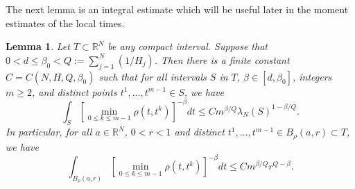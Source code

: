 \documentclass[11pt, reqno]{amsart}
\newtheorem{lemma}[theorem]{Lemma}
\def\R{{\mathbb R}}
\numberwithin{equation}{section}
\begin{document}
The next lemma is an integral estimate which will be useful later in the moment estimates of the local times.

\begin{lemma}\label{Lem:Bd_int}
Let $T \subset \R^N$ be any compact interval. Suppose that $0 < d \le \beta_0 < Q :=  \sum_{j=1}^N (1/H_j)$.
Then there is a finite constant $C = C(N, H, Q, \beta_0)$ such that for all intervals $S$ in $T$,  $\beta 
\in [d, \beta_0]$, integers $m \ge 2$, and distinct points $t^1, \dots, t^{m-1} \in S$, we have
\begin{equation}\label{Eq:Bd_int_Leb}
 \int_S \left[ \min_{0\le k \le m-1} \rho(t, t^k) \right]^{-\beta} dt \le C m^{\beta/Q} \lambda_N(S)^{1-\beta/Q}.
\end{equation}
In particular, for all $a \in \R^N$, $0 < r < 1$ and distinct $t^1, \dots, t^{m-1} \in B_\rho(a, r) \subset T$, we have
\begin{equation}\label{Eq:Bd_int}
 \int_{B_\rho(a, r)} \left[ \min_{0\le k \le m-1} \rho(t, t^k) \right]^{-\beta} dt \le C m^{\beta/Q} r^{Q-\beta}.
\end{equation}
\end{lemma}
\end{document}
